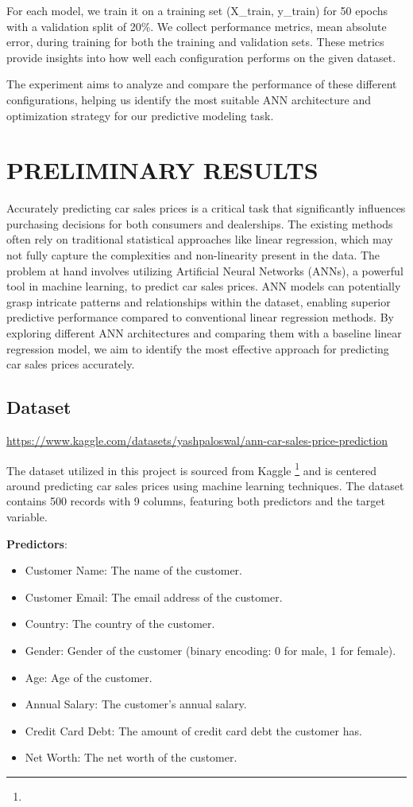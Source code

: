 \documentclass[manuscript,screen,review,nonacm]{acmart}
\begin{document}
For each model, we train it on a training set (X_train, y_train) for 50 epochs with a validation split of 20\%. We collect performance metrics, mean absolute error, during training for both the training and validation sets. These metrics provide insights into how well each configuration performs on the given dataset.

The experiment aims to analyze and compare the performance of these different configurations, helping us identify the most suitable ANN architecture and optimization strategy for our predictive modeling task.

\section{PRELIMINARY RESULTS}
Accurately predicting car sales prices is a critical task that significantly influences purchasing decisions for both consumers and dealerships. The existing methods often rely on traditional statistical approaches like linear regression, which may not fully capture the complexities and non-linearity present in the data. The problem at hand involves utilizing Artificial Neural Networks (ANNs), a powerful tool in machine learning, to predict car sales prices. ANN models can potentially grasp intricate patterns and relationships within the dataset, enabling superior predictive performance compared to conventional linear regression methods. By exploring different ANN architectures and comparing them with a baseline linear regression model, we aim to identify the most effective approach for predicting car sales prices accurately.

\subsection{Dataset}
\urldef{\dataurl}\url{https://www.kaggle.com/datasets/yashpaloswal/ann-car-sales-price-prediction}


The dataset utilized in this project is sourced from Kaggle \footnote{\dataurl} and is centered around predicting car sales prices using machine learning techniques. The dataset contains 500 records with 9 columns, featuring both predictors and the target variable. 


\textbf{Predictors}:
\begin{itemize}
    \item Customer Name: The name of the customer.
    \item Customer Email: The email address of the customer.
    \item Country: The country of the customer.
    \item Gender: Gender of the customer (binary encoding: 0 for male, 1 for female).
    \item Age: Age of the customer.
    \item Annual Salary: The customer's annual salary.
    \item Credit Card Debt: The amount of credit card debt the customer has.
    \item Net Worth: The net worth of the customer.
\end{itemize}
\end{document}
